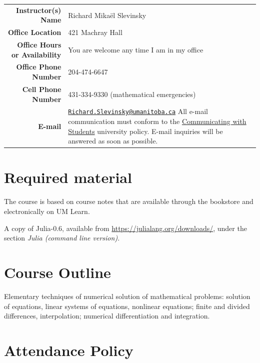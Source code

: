 \documentclass[12pt]{article}
\newlength{\infoTableSpace}
\begin{document}
\noindent
\begin{tabular*}{\linewidth}{r@{\hspace{\infoTableSpace}}l}
	\toprule
	\textbf{Instructor(s) Name} 			& Richard Mika\"el Slevinsky 	\\ 
	\textbf{Office Location}				& 421 Machray Hall	\\
	\textbf{Office Hours or Availability} & You are welcome any time I am in my office \\
	\textbf{Office Phone Number} 			& 204-474-6647	\\
	\textbf{Cell Phone Number} 			& 431-334-9330 (mathematical emergencies) \\
	\textbf{E-mail}	& \begin{minipage}[t]{0.65\linewidth}	
			\href{mailto:Richard.Slevinsky@umanitoba.ca}{\texttt{Richard.Slevinsky@umanitoba.ca}}
			All e-mail communication must conform to the 
			\href{http://umanitoba.ca/admin/governance/media/Electronic_Communication_with_Students_Policy_-_2014_06_05.pdf}{Communicating with Students} university policy. E-mail inquiries will be answered as soon as possible.			
		\end{minipage} \\
	\bottomrule
\end{tabular*}


\section{Required material}

The course is based on course notes that are available through the bookstore and electronically on UM Learn.

A copy of {\sc Julia-0.6}, available from \href{https://julialang.org/downloads/}{https://julialang.org/downloads/}, under the section {\em Julia (command line version)}.

\section{Course Outline}

Elementary techniques of numerical solution of mathematical problems: solution of equations, linear systems of equations, nonlinear equations; finite and divided differences, interpolation; numerical differentiation and integration.

\section{Attendance Policy}
\end{document}

